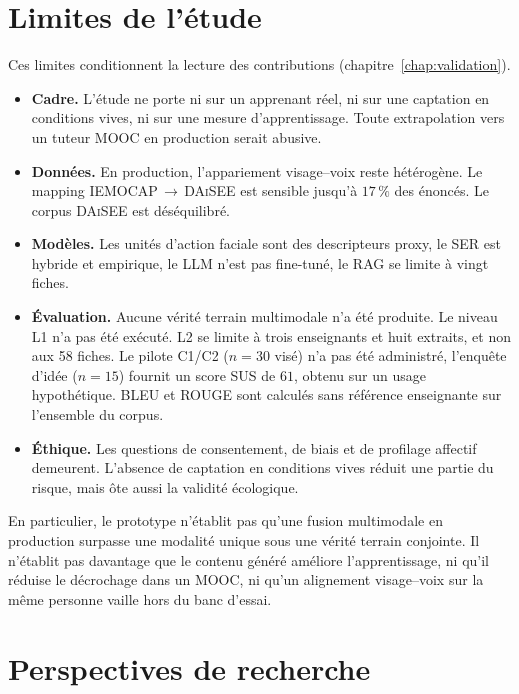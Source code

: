 \section*{Limites de l'étude}

Ces limites conditionnent la lecture des contributions
(chapitre~\ref{chap:validation}).

\begin{itemize}[leftmargin=1.4em]
  \item \textbf{Cadre.} L'étude ne porte ni sur un apprenant réel, ni
  sur une captation en conditions vives, ni sur une mesure
  d'apprentissage. Toute extrapolation vers un tuteur MOOC en
  production serait abusive.

  \item \textbf{Données.} En production, l'appariement visage--voix
  reste hétérogène. Le mapping
  \textsc{IEMOCAP}\,$\rightarrow$\,\textsc{DAiSEE} est sensible
  jusqu'à $17\,\%$ des énoncés. Le corpus \textsc{DAiSEE} est
  déséquilibré.

  \item \textbf{Modèles.} Les unités d'action faciale sont des
  descripteurs proxy, le SER est hybride et empirique, le LLM n'est
  pas fine-tuné, le RAG se limite à vingt fiches.

  \item \textbf{Évaluation.} Aucune vérité terrain multimodale n'a été
  produite. Le niveau L1 n'a pas été exécuté. L2 se limite à trois
  enseignants et huit extraits, et non aux 58 fiches. Le pilote C1/C2
  ($n=30$ visé) n'a pas été administré, l'enquête d'idée ($n=15$)
  fournit un score SUS de $61$, obtenu sur un usage hypothétique.
  BLEU et ROUGE sont calculés sans référence enseignante sur
  l'ensemble du corpus.

  \item \textbf{Éthique.} Les questions de consentement, de biais et de
  profilage affectif demeurent. L'absence de captation en conditions
  vives réduit une partie du risque, mais ôte aussi la validité
  écologique.
\end{itemize}

En particulier, le prototype n'établit pas qu'une fusion multimodale
en production surpasse une modalité unique sous une vérité terrain
conjointe. Il n'établit pas davantage que le contenu généré améliore
l'apprentissage, ni qu'il réduise le décrochage dans un MOOC, ni qu'un
alignement visage--voix sur la même personne vaille hors du banc
d'essai.

\section*{Perspectives de recherche}

